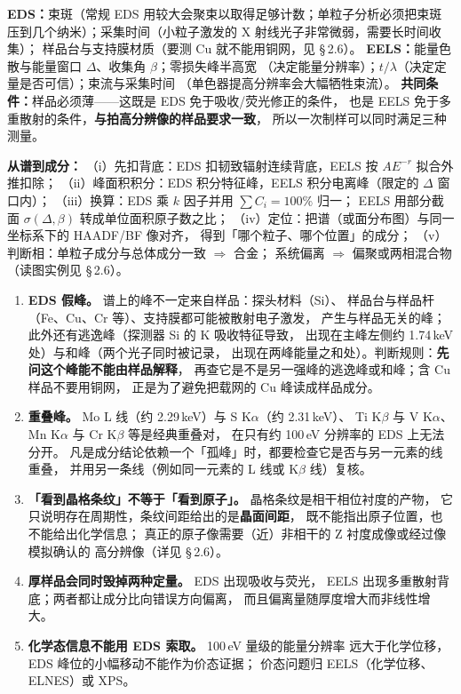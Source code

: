 \begin{measure}
\textbf{EDS：}束斑（常规 EDS 用较大会聚束以取得足够计数；单粒子分析必须把束斑
压到几个纳米）；采集时间（小粒子激发的 X 射线光子非常微弱，需要长时间收集）；
样品台与支持膜材质（要测 Cu 就不能用铜网，见 \S\,2.6）。
\textbf{EELS：}能量色散与能量窗口 $\Delta$、收集角 $\beta$；零损失峰半高宽
（决定能量分辨率）；$t/\lambda$（决定定量是否可信）；束流与采集时间
（单色器提高分辨率会大幅牺牲束流）。
\textbf{共同条件：}样品必须薄——这既是 EDS 免于吸收/荧光修正的条件，
也是 EELS 免于多重散射的条件，\textbf{与拍高分辨像的样品要求一致}，
所以一次制样可以同时满足三种测量。
\end{measure}

\begin{dataflow}
\textbf{从谱到成分：}
（i）先扣背底：EDS 扣韧致辐射连续背底，EELS 按 $AE^{-r}$ 拟合外推扣除；
（ii）峰面积积分：EDS 积分特征峰，EELS 积分电离峰（限定的 $\Delta$ 窗口内）；
（iii）换算：EDS 乘 $k$ 因子并用 $\sum C_i=100\%$ 归一；
EELS 用部分截面 $\sigma(\Delta,\beta)$ 转成单位面积原子数之比；
（iv）定位：把谱（或面分布图）与同一坐标系下的 HAADF/BF 像对齐，
得到「哪个粒子、哪个位置」的成分；
（v）判断相：单粒子成分与总体成分一致 $\Rightarrow$ 合金；
系统偏离 $\Rightarrow$ 偏聚或两相混合物（读图实例见 \S\,2.6）。
\end{dataflow}

\begin{pitfall}
\begin{enumerate}[leftmargin=1.6em]
\item \textbf{EDS 假峰。} 谱上的峰不一定来自样品：探头材料（Si）、
样品台与样品杆（Fe、Cu、Cr 等）、支持膜都可能被散射电子激发，
产生与样品无关的峰；此外还有逃逸峰（探测器 Si 的 K 吸收特征导致，
出现在主峰左侧约 1.74\,keV 处）与和峰（两个光子同时被记录，
出现在两峰能量之和处）。判断规则：\textbf{先问这个峰能不能由样品解释}，
再查它是不是另一强峰的逃逸峰或和峰；含 Cu 样品不要用铜网，
正是为了避免把载网的 Cu 峰读成样品成分。
\item \textbf{重叠峰。} Mo L 线（约 2.29\,keV）与 S K$\alpha$（约 2.31\,keV）、
Ti K$\beta$ 与 V K$\alpha$、Mn K$\alpha$ 与 Cr K$\beta$ 等是经典重叠对，
在只有约 100\,eV 分辨率的 EDS 上无法分开。
凡是成分结论依赖一个「孤峰」时，都要检查它是否与另一元素的线重叠，
并用另一条线（例如同一元素的 L 线或 K$\beta$ 线）复核。
\item \textbf{「看到晶格条纹」不等于「看到原子」。} 晶格条纹是相干相位衬度的产物，
它只说明存在周期性，条纹间距给出的是\textbf{晶面间距}，
既不能指出原子位置，也不能给出化学信息；
真正的原子像需要（近）非相干的 Z 衬度成像或经过像模拟确认的
高分辨像（详见 \S\,2.6）。
\item \textbf{厚样品会同时毁掉两种定量。} EDS 出现吸收与荧光，
EELS 出现多重散射背底；两者都让成分比向错误方向偏离，
而且偏离量随厚度增大而非线性增大。
\item \textbf{化学态信息不能用 EDS 索取。} 100\,eV 量级的能量分辨率
远大于化学位移，EDS 峰位的小幅移动不能作为价态证据；
价态问题归 EELS（化学位移、ELNES）或 XPS。
\end{enumerate}
\end{pitfall}

